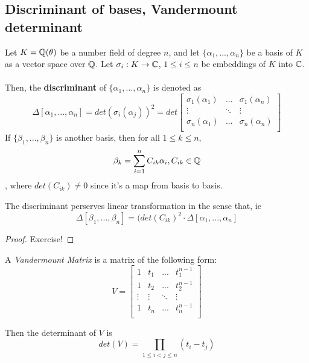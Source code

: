 \subsection{Discriminant of bases, Vandermount determinant}

\begin{definition}
Let $K = \mathbb{Q}(\theta)$ be a number field of degree $n$, and let $\{\alpha_1, ..., \alpha_n\}$ be a basis of $K$ as a vector space over $\mathbb{Q}$. Let $\sigma_i: K \to \mathbb{C}$, $1 \leq i \leq n$ be embeddings of $K$ into $\mathbb{C}$.\\\\
Then, the \textbf{discriminant} of $\{\alpha_1, ..., \alpha_n\}$ is denoted as
\[\Delta[\alpha_1, ..., \alpha_n] = det(\sigma_i(\alpha_j))^2 = det\begin{bmatrix}
\sigma_1(\alpha_1) & ... & \sigma_1(\alpha_n)\\
\vdots & \ddots & \vdots\\
\sigma_n(\alpha_1) & ... & \sigma_n(\alpha_n)\\
\end{bmatrix}\]
If $\{\beta_1, ..., \beta_n\}$ is another basis, then for all $1 \leq k \leq n$,
\[\beta_k = \sum_{i = 1}^n C_{ik} \alpha_i, C_{ik} \in \mathbb{Q}\]
, where $det(C_{ik}) \neq 0$ since it's a map from basis to basis.
\end{definition}

\begin{proposition} The discriminant perserves linear transformation in the sense that, ie
\[\Delta[\beta_1, ..., \beta_n] = (det(C_{ik})^2 \cdot \Delta[\alpha_1, ..., \alpha_n]\]
\end{proposition}

\begin{proof}
Exercise!
\end{proof}

\begin{definition}
A \textit{Vandermount Matrix} is a matrix of the following form:
\[V = \begin{bmatrix}
1 & t_1 & ... & t_1^{n-1}\\
1 & t_2 & ... & t_2^{n-1}\\
\vdots & \vdots & \ddots & \vdots\\
1 & t_n & ... & t_n^{n-1}\\
\end{bmatrix}\]
\end{definition}

\begin{proposition}
Then the determinant of $V$ is
\[det(V) = \prod_{1 \leq i < j \leq n} (t_i - t_j)\]
\end{proposition}

